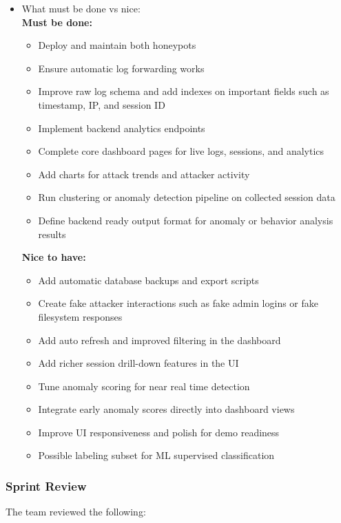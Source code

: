 \documentclass{article}
\begin{document}
\begin{itemize}
    \item What must be done vs nice:
    \\\textbf{Must be done:}
    \begin{itemize}
        \item Deploy and maintain both honeypots 
        \item Ensure automatic log forwarding works 
        \item Improve raw log schema and add indexes on important fields such as timestamp, IP, and session ID
        \item Implement backend analytics endpoints
        \item Complete core dashboard pages for live logs, sessions, and analytics
        \item Add charts for attack trends and attacker activity
        \item Run clustering or anomaly detection pipeline on collected session data
        \item Define backend ready output format for anomaly or behavior analysis results
    \end{itemize}
    \textbf{Nice to have:}
    \begin{itemize}
        \item Add automatic database backups and export scripts
        \item Create fake attacker interactions such as fake admin logins or fake filesystem responses
        \item Add auto refresh and improved filtering in the dashboard
        \item Add richer session drill-down features in the UI
        \item Tune anomaly scoring for near real time detection
        \item Integrate early anomaly scores directly into dashboard views
        \item Improve UI responsiveness and polish for demo readiness
        \item Possible labeling subset for ML supervised classification
    \end{itemize}
    

\end{itemize}

\subsubsection{Sprint Review}

The team reviewed the following:
\end{document}
